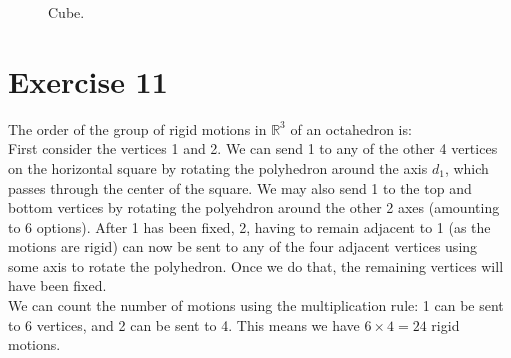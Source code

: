 \documentclass{article}
\newcommand{\R}{\mathbb{R}}
\begin{document}
\begin{figure}[H]

        \caption{\label{fig:figure1} Cube.}
    \end{figure}


    \section*{Exercise 11}
    The order of the group of rigid motions in $\R^3$ of an octahedron is: \\
    First consider the vertices 1 and 2.
    We can send 1 to any of the other 4 vertices on the horizontal square by
    rotating the polyhedron around the axis $d_1$, which passes through
    the center of the square. We may also send 1 to the top and bottom vertices
    by rotating the polyehdron around the other 2 axes (amounting to 6 options).
    After 1 has been fixed, 2, having to remain adjacent to 1 (as the
    motions are rigid) can now be sent to any of the four adjacent vertices
    using some axis to rotate the polyhedron. Once we do that, the
    remaining vertices will have been fixed. \\
    We can count the number of motions using the multiplication rule:
    1 can be sent to 6 vertices, and 2 can be sent to 4. This means we
    have $6 \times 4 = 24$ rigid motions. 
\end{document}
